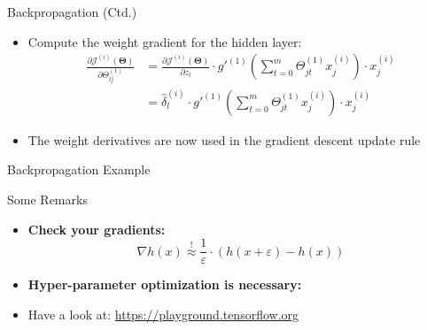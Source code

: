 \begin{frame}{Backpropagation (Ctd.)}{}\important
	\begin{itemize}
		\item Compute the weight gradient for the hidden layer:
		\begin{align*}
			\frac{\partial \mathcal{J}^{(i)}(\bm{\Theta})}{\partial \Theta_{lj}^{(1)}}
				&= \frac{\partial \mathcal{J}^{(i)}(\bm{\Theta})}{\partial z_l} \cdot g'^{(1)} \left( \sum_{t=0}^m \Theta_{jt}^{(1)} x_j^{(i)} \right) \cdot x_j^{(i)} \\
				&= \widehat{\delta}_l^{(i)} \cdot g'^{(1)} \left( \sum_{t=0}^m \Theta_{jt}^{(1)} x_j^{(i)} \right) \cdot x_j^{(i)}
		\end{align*}
		\item The weight derivatives are now used in the gradient descent update rule
	\end{itemize}
\end{frame}


\begin{frame}{Backpropagation Example}{}
	\vfill
	\begin{center}
		\Huge {}
	\end{center}
	\vfill
\end{frame}


\begin{frame}{Some Remarks}{}
	\begin{itemize}
		\item \textbf{Check your gradients:}
		\begin{equation*}
			\nabla h(x) \overset{!}{\approx} \frac{1}{\varepsilon} \cdot (h(x + \varepsilon) - h(x))
		\end{equation*}
		\item \textbf{Hyper-parameter optimization is necessary:}
	\end{itemize}
	\begin{itemize}
		\item Have a look at: \url{https://playground.tensorflow.org}
	\end{itemize}
\end{frame}


